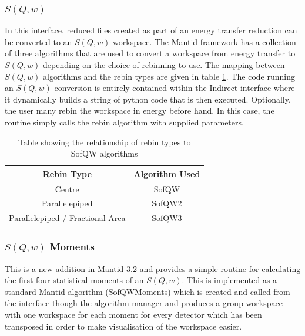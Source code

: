 \documentclass[paper=a4, fontsize=11pt]{scrartcl}	%
\numberwithin{equation}{section}															%
\numberwithin{figure}{section}																%
\numberwithin{table}{section}																%
\begin{document}
\subsubsection{$S(Q,w)$}
\label{subsec:sofqw}
In this interface, reduced files created as part of an energy transfer reduction can be converted to an $S(Q,w)$ workspace. The Mantid framework has a collection of three algorithms that are used to convert a workspace from energy transfer to $S(Q,w)$ depending on the choice of rebinning to use. The mapping between $S(Q,w)$ algorithms and the rebin types are given in table \ref{table:sofqw-algorithms}. The code running an $S(Q,w)$ conversion is entirely contained within the Indirect interface where it dynamically builds a string of python code that is then executed. Optionally, the user many rebin the workspace in energy before hand. In this case, the routine simply calls the rebin algorithm with supplied parameters.

\begin{table}[H]
\begin{center}
\begin{tabular}{ c c}
Rebin Type & Algorithm Used \\ \hline
Centre & SofQW \\
Parallelepiped & SofQW2 \\
Parallelepiped / Fractional Area & SofQW3 \\
\end{tabular}
\caption{Table showing the relationship of rebin types to SofQW algorithms}
\label{table:sofqw-algorithms}
\end{center}
\end{table}

\subsubsection{$S(Q,w)$ Moments}
This is a new addition in Mantid 3.2 and provides a simple routine for calculating the first four statistical moments of an $S(Q,w)$. This is implemented as a standard Mantid algorithm (SofQWMoments) which is created and called from the interface though the algorithm manager and produces a group workspace with one workspace for each moment for every detector which has been transposed in order to make visualisation of the workspace easier.
\end{document}
